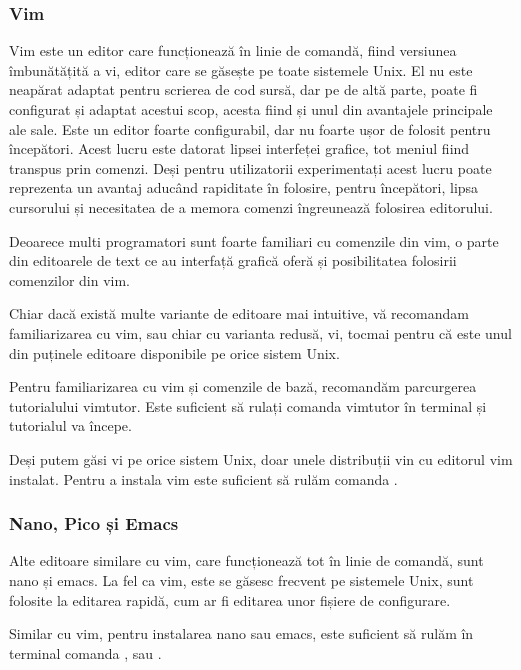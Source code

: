 \subsubsection{Vim}
\label{sec:appdev-textedit-vim}

Vim este un editor care funcționează în linie de comandă, fiind versiunea
îmbunătățită a vi, editor care se găsește pe toate sistemele Unix. El nu este
neapărat adaptat pentru scrierea de cod sursă, dar pe de altă parte, poate fi
configurat și adaptat acestui scop, acesta fiind și unul din avantajele
principale ale sale. Este un editor foarte configurabil, dar nu foarte ușor de
folosit pentru începători. Acest lucru este datorat lipsei interfeței grafice,
tot meniul fiind transpus prin comenzi. Deși pentru utilizatorii experimentați
acest lucru poate reprezenta un avantaj aducând rapiditate în folosire, pentru
începători, lipsa cursorului și necesitatea de a memora comenzi îngreunează
folosirea editorului.

Deoarece multi programatori sunt foarte familiari cu comenzile din vim, o parte
din editoarele de text ce au interfață grafică oferă și posibilitatea folosirii
comenzilor din vim.

Chiar dacă există multe variante de editoare mai intuitive, vă recomandam
familiarizarea cu vim, sau chiar cu varianta redusă, vi, tocmai pentru că este
unul din puținele editoare disponibile pe orice sistem Unix.

Pentru familiarizarea cu vim și comenzile de bază, recomandăm parcurgerea
tutorialului vimtutor. Este suficient să rulați comanda vimtutor în terminal și
tutorialul va începe.

Deși putem găsi vi pe orice sistem Unix, doar unele distribuții vin cu editorul
vim instalat. Pentru a instala vim este suficient să rulăm comanda .

\subsubsection{Nano, Pico și Emacs}
\label{sec:appdev-textedit-nano-pico-emacs}

Alte editoare similare cu vim, care funcționează tot în linie de comandă, sunt
nano și emacs. La fel ca vim, este se găsesc frecvent pe sistemele Unix, sunt
folosite la editarea rapidă, cum ar fi editarea unor fișiere de configurare.

Similar cu vim, pentru instalarea nano sau emacs, este suficient să rulăm în
terminal comanda ,  sau
.

